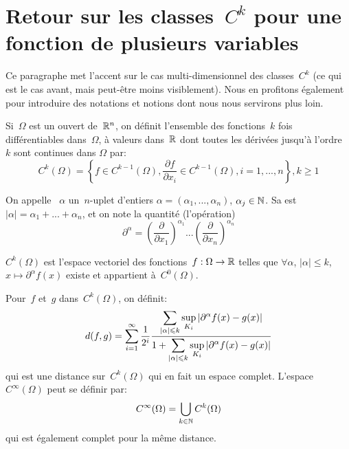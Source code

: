 \medskip
\section{Retour sur les classes~$C^k$ pour une fonction de plusieurs variables}

Ce paragraphe met l'accent sur le cas multi-dimensionnel des classes~$C^k$ (ce qui est le cas avant, mais peut-être moins visiblement). Nous en profitons également pour introduire des notations et notions dont nous nous servirons plus loin.

\medskip
\begin{definition}
Si~$\Omega$ est un ouvert de~$\mathbb R^n$, on définit l'ensemble des fonctions~$k$ fois différentiables dans~$\Omega$, à valeurs dans~$\mathbb R$ dont toutes les dérivées jusqu'à l'ordre~$k$ sont continues dans $\Omega$ par:
\begin{equation}
C^k(\Omega) = \left\{f\in C^{k-1}(\Omega), \dfrac{\partial f}{\partial x_i}\in C^{k-1}(\Omega),
i=1, ..., n\right\}, k\ge 1
\end{equation}
\end{definition}

\medskip
\begin{definition}
On appelle ~$\alpha$ un~$n$-uplet d'entiers $\alpha=(\alpha_1, ..., \alpha_n)$, $\alpha_j\in\mathbb N$.
Sa  est~$|\alpha|=\alpha_1+ ... + \alpha_n$, et on note  la quantité (l'opération)
\begin{equation}
   \partial^\alpha=\left(\dfrac{\partial}{\partial x_1}\right)^{\alpha_1}...\left(\dfrac{\partial}{\partial x_n}\right)^{\alpha_n}\end{equation}
\end{definition}

\medskip{}
$C^k(\Omega)$ est l'espace vectoriel des fonctions~$f: \Omega \to \mathbb R$ telles que $\forall \alpha$, $|\alpha|\le k$, $x\mapsto \partial^\alpha f(x)$ existe et appartient à~$C^0(\Omega)$.

Pour~$f$ et~$g$ dans~$C^k(\Omega)$, on définit:
\begin{equation}
d(f,g)=\dsum_{i=1}^\infty \dfrac1{2^i}\dfrac{\dsum_{|\alpha|\le k} \sup_{K_i}|\partial^\alpha f(x)-g(x)|}{%
1+\dsum_{|\alpha|\le k} \sup_{K_i}|\partial^\alpha f(x)-g(x)|}
\end{equation}
qui est une distance sur~$C^k(\Omega)$ qui en fait un espace complet. L'espace~$C^\infty(\Omega)$ peut se définir par:
\begin{equation} C^\infty(\Omega)=\bigcup\limits_{k\in\mathbb N}C^k(\Omega)\end{equation}
qui est également complet pour la même distance.

